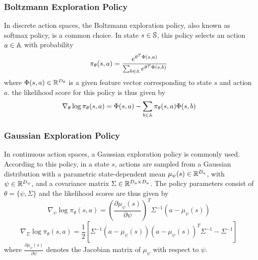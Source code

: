 \subsubsection{Boltzmann Exploration Policy}
\label{sec:softmax}
In discrete action spaces, the Boltzmann exploration policy, also known as softmax policy, is a common choice. In state $s \in \S$, this policy selects an action $a \in \A$ with probability 
\begin{equation}
	\pi_\theta(s,a) = \frac{e^{\theta^T \Phi(s,a)}}{\sum_{b \in \A} e^{\theta^T \Phi(s,b)}}
\end{equation}    
where $\Phi(s,a) \in \R^{D_\theta}$ is a given feature vector corresponding to state $s$ and action $a$. the likelihood score for this policy is thus given by 
\begin{equation}
\nabla_\theta \log \pi_\theta(s,a) = \Phi(s,a) - \sum_{b\in\A} \pi_\theta(s,a) \Phi(s,b)
\end{equation}

\subsubsection{Gaussian Exploration Policy} 
\label{sec:gaussian_policy}
In continuous action spaces, a Gaussian exploration policy is commonly used. According to this policy, in a state $s$, actions are sampled from a Gaussian distribution with a parametric state-dependent mean $\mu_\psi(s) \in \R^{D_a}$, with $\psi \in \R^{D_\psi}$, and a covariance matrix $\Sigma \in \R^{D_a \times D_a}$. The policy parameters consist of $\theta = \{\psi, \Sigma\}$ and the likelihood scores are thus given by 
\begin{equation}
	\nabla_\psi \log \pi_\theta(s,a) = \left(\frac{\partial \mu_\psi(s)}{\partial \psi}\right)^T \Sigma^{-1} (a - \mu_\psi(s))
\end{equation}
\begin{equation}
	\nabla_\Sigma \log \pi_\theta(s,a) = \frac{1}{2}\left[\Sigma^{-1} \left(a - \mu_\psi(s)\right) \left(a - \mu_\psi(s)\right)^T \Sigma^{-1} - \Sigma^{-1}\right]
\end{equation}
where $\frac{\partial \mu_\psi(s)}{\partial \psi}$ denotes the Jacobian matrix of $\mu_\psi$ with respect to $\psi$.

